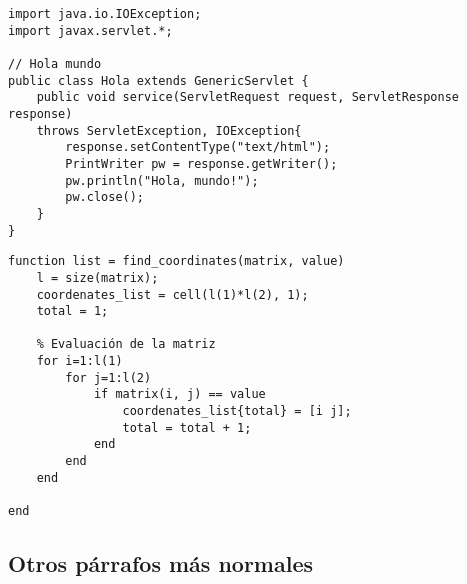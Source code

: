 \lstset{style=Java}
\begin{lstlisting}[caption=Ejemplo en Java]
import java.io.IOException; 
import javax.servlet.*;

// Hola mundo
public class Hola extends GenericServlet {
	public void service(ServletRequest request, ServletResponse response)
	throws ServletException, IOException{
		response.setContentType("text/html");
		PrintWriter pw = response.getWriter();
		pw.println("Hola, mundo!");
		pw.close();
	}
}
\end{lstlisting}

\lstset{style=Matlab}
\begin{lstlisting}[caption=Ejemplo en Matlab]
function list = find_coordinates(matrix, value)
	l = size(matrix);
	coordenates_list = cell(l(1)*l(2), 1);
	total = 1;

	% Evaluación de la matriz
	for i=1:l(1)
		for j=1:l(2)
			if matrix(i, j) == value
				coordenates_list{total} = [i j];
				total = total + 1;
			end
		end
	end

end
\end{lstlisting}
	
	\subsection{Otros párrafos más normales}
		
		\lipsum[7]
		
		\newp \lipsum[2]
		
		
		\begin{multicols}{2}
			
			\lipsum[114]
			
			
			\lipsum[5]
			
		\end{multicols}
		
		\lipsum[1]


